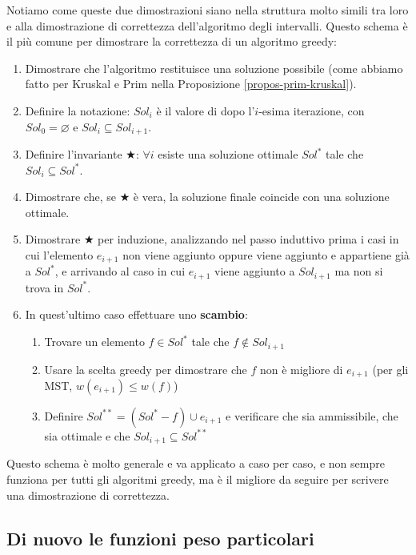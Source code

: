 \documentclass[11pt, a4paper, titlepage, oneside]{scrbook}
\begin{document}
\begin{Proposizione}
\label{propos-schema-generale}
Notiamo come queste due dimostrazioni siano nella struttura molto simili tra loro e alla dimostrazione di correttezza dell'algoritmo degli intervalli. Questo schema è il più comune per dimostrare la correttezza di un algoritmo greedy:
\begin{enumerate}[label=\arabic*°]
    \item Dimostrare che l'algoritmo restituisce una soluzione possibile (come abbiamo fatto per Kruskal e Prim nella Proposizione \ref{propos-prim-kruskal}).
    \item Definire la notazione: $Sol_i$ è il valore di  dopo l'$i$-esima iterazione, con $Sol_0 = \varnothing$ e $Sol_i \subseteq Sol_{i+1}$.
    \item Definire l'invariante $\bigstar$: $\forall i$ esiste una soluzione ottimale $Sol^*$ tale che $Sol_i \subseteq Sol^*$.
    \item Dimostrare che, se $\bigstar$ è vera, la soluzione finale coincide con una soluzione ottimale.
    \item Dimostrare $\bigstar$ per induzione, analizzando nel passo induttivo prima i casi in cui l'elemento $e_{i+1}$ non viene aggiunto oppure viene aggiunto e appartiene già a $Sol^*$, e arrivando al caso in cui $e_{i+1}$ viene aggiunto a $Sol_{i+1}$ ma non si trova in $Sol^*$.
    \item In quest'ultimo caso effettuare uno \textbf{scambio}:
    \begin{enumerate}[label=\alph*)]
        \item Trovare un elemento $f \in Sol^*$ tale che $f \notin Sol_{i+1}$
        \item Usare la scelta greedy per dimostrare che $f$ non è migliore di $e_{i+1}$ (per gli MST, $w(e_{i+1}) \leq w(f)$)
        \item Definire $Sol^{**} = (Sol^* - f) \cup e_{i+1}$ e verificare che sia ammissibile, che sia ottimale e che $Sol_{i+1} \subseteq Sol^{**}$
    \end{enumerate}
\end{enumerate}
\end{Proposizione}


Questo schema è molto generale e va applicato a caso per caso, e non sempre funziona per tutti gli algoritmi greedy, ma è il migliore da seguire per scrivere una dimostrazione di correttezza.

\subsection{Di nuovo le funzioni peso particolari}
\end{document}

